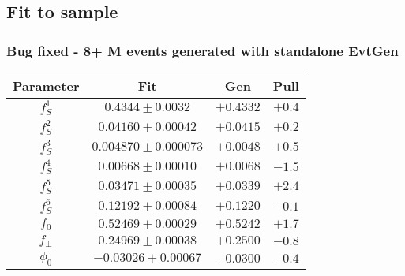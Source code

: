 \documentclass[aspectratio=43,9pt]{beamer}
\begin{document}
\subsection{Fit to sample} %
\begin{frame}[default] %
  \frametitle{Bug fixed - 8+ M events generated with standalone EvtGen}
  
  \centering
  \begin{tabular}{cccc}
    \hline
    Parameter  &                   Fit  &      Gen  &  Pull \\
    \hline
    $                       f_S^{1} $&$         0.4344 \pm 0.0032 $&$ +0.4332 $&$ +0.4 $\\
    $                       f_S^{2} $&$       0.04160 \pm 0.00042 $&$ +0.0415 $&$ +0.2 $\\
    $                       f_S^{3} $&$     0.004870 \pm 0.000073 $&$ +0.0048 $&$ +0.5 $\\
    $                       f_S^{4} $&$       0.00668 \pm 0.00010 $&$ +0.0068 $&$ -1.5 $\\
    $                       f_S^{5} $&$       0.03471 \pm 0.00035 $&$ +0.0339 $&$ +2.4 $\\
    $                       f_S^{6} $&$       0.12192 \pm 0.00084 $&$ +0.1220 $&$ -0.1 $\\
    $                           f_0 $&$       0.52469 \pm 0.00029 $&$ +0.5242 $&$ +1.7 $\\
    $                     f_{\perp} $&$       0.24969 \pm 0.00038 $&$ +0.2500 $&$ -0.8 $\\
    $                        \phi_0 $&$      -0.03026 \pm 0.00067 $&$ -0.0300 $&$ -0.4 $\\

\end{tabular}
\end{frame}
\end{document}
